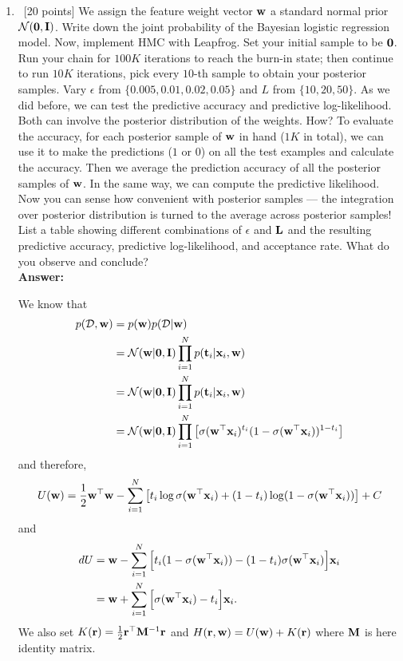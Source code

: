 \documentclass[12pt, fullpage,letterpaper]{article}
\def\red{\color{black!30!red}}
\def\blackblue{\color{black!40!blue}}
\begin{document}
\begin{enumerate}
	\begin{enumerate}
		\item~[20 points] We assign the feature weight vector ${\bf w}$ a standard normal prior $\mathcal{N}({\bf 0}, {\bf I})$. Write down the joint probability of the Bayesian logistic regression model. Now, implement HMC with Leapfrog. Set your initial sample to be ${\bf 0}$. Run your chain for $100K$ iterations to reach the burn-in state; then continue to run $10K$ iterations, pick every $10$-th sample to obtain your posterior samples. Vary $\epsilon$ from $\{0.005, 0.01, 0.02, 0.05\}$ and $L$ from $\{10, 20, 50\}$. As we did before, we can test the predictive accuracy and predictive log-likelihood. Both can involve the posterior distribution of the weights. How? To evaluate the accuracy, for each posterior sample of ${\bf w}$ in hand ($1K$ in total), we can use it to make the predictions ($1$ or $0$) on all the test examples and calculate the accuracy. Then we average the prediction accuracy of all the posterior samples of ${\bf w}$. In the same way, we can compute the predictive likelihood. Now you can sense how convenient with posterior samples ---  the integration over posterior distribution is turned to the average across posterior samples! List a table showing different combinations of $\epsilon$ and ${\bf L}$ and the resulting predictive accuracy, predictive log-likelihood, and acceptance rate.  What do you observe and conclude?\\
{\bf \red Answer: }{\blackblue 
We know that 
\begin{align*}
p(\mathcal{D}, {\bf w}) & = p({\bf w})p(\mathcal{D}|{\bf w})\\
& = \mathcal{N}({\bf w}|{\bf 0},{\bf I})\prod_{i=1}^Np({\bf t}_i|{\bf x}_i,{\bf w})\\
& = \mathcal{N}({\bf w}|{\bf 0},{\bf I})\prod_{i=1}^Np({\bf t}_i|{\bf x}_i,{\bf w})\\
& = \mathcal{N}({\bf w}|{\bf 0},{\bf I})\prod_{i=1}^N\left[\sigma({\bf w}^\top{\bf x}_i)^{t_i}(1-\sigma({\bf w}^\top{\bf x}_i))^{1-t_i}\right]
\end{align*}
and therefore, 
$$U({\bf w}) = \frac{1}{2}{\bf w}^\top {\bf w} - \sum_{i=1}^N \left[t_i\log\sigma({\bf w}^\top{\bf x}_i) + (1-t_i)\log(1-\sigma({\bf w}^\top{\bf x}_i))\right] + C$$
and 
\begin{align*}
dU & = {\bf w} - \sum_{i=1}^N \Big[t_i(1-\sigma({\bf w}^\top{\bf x}_i)) - (1-t_i)\sigma({\bf w}^\top{\bf x}_i) \Big]{\bf x}_i\\
& = {\bf w} + \sum_{i=1}^N \Big[\sigma({\bf w}^\top{\bf x}_i) - t_i\Big]{\bf x}_i.
\end{align*}
We also set $K({\bf r}) = \frac{1}{2}{\bf r}^\top {\bf M}^{-1}{\bf r}$ and $H({\bf r},{\bf w}) = U({\bf w}) + K({\bf r})$ where ${\bf M}$ is here identity matrix. 
\begin{center}

\end{center}}
\end{enumerate}
\end{enumerate}
\end{document}
